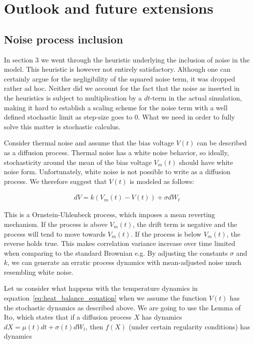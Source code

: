 \section{Outlook and future extensions}

\subsection{Noise process inclusion}
In section 3 we went through the heuristic underlying the inclusion of
noise in the model. This heuristic is however not entirely
satisfactory. Although one can certainly argue for the negligibility
of the squared noise term, it was dropped rather ad hoc. Neither did
we account for the fact that the noise as inserted in the heuristics
is subject to multiplication by a $dt$-term in the actual simulation,
making it hard to establish a scaling scheme for the noise term with a
well defined stochastic limit as step-size goes to 0. What we need in
order to fully solve this matter is stochastic calculus.


Consider thermal noise and assume that the bias voltage $V(t)$ can be
described as a diffusion process. Thermal noise has a white noise
behavior, so ideally, stochasticity around the mean of the bias
voltage $V_{m}(t)$ should have white noise form. Unfortunately, white
noise is not possible to write as a diffusion process. We therefore
suggest that $V(t)$ is modeled as follows:


\begin{align*}
d V = k(V_{m}(t)-V(t)) + \sigma dW_{t}
\end{align*}

This is a Ornstein-Uhlenbeck process, which imposes a mean reverting
mechanism. If the process is above $V_m(t)$, the drift term is
negative and the process will tend to move towards $V_m(t)$. If the
process is below $V_m(t)$, the reverse holds true. This makes
correlation variance increase over time limited when comparing to the
standard Brownian e.g. By adjusting the constants $\sigma$ and $k$, we
can generate an erratic process dynamics with mean-adjusted noise much
resembling white noise.


Let us consider what happens with the temperature dynamics in
equation~\eqref{eq:heat_balance_equation} when we assume the function
$V(t)$ has the stochastic dynamics as described above. We are going to
use the Lemma of Ito, which states that if a diffusion process $X$ has
dynamics $dX = \mu(t)dt + \sigma(t)dW_{t}$, then $f(X)$ (under certain
regularity conditions) has dynamics


